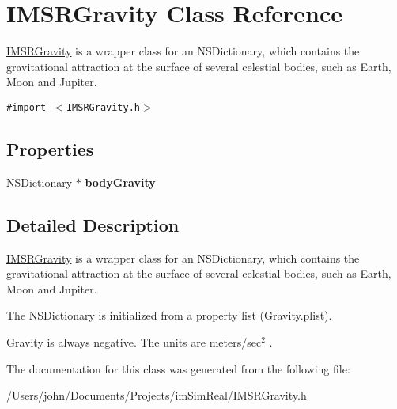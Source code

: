\hypertarget{interface_i_m_s_r_gravity}{
\section{IMSRGravity Class Reference}
\label{interface_i_m_s_r_gravity}
}
\hyperlink{interface_i_m_s_r_gravity}{IMSRGravity} is a wrapper class for an NSDictionary, which contains the gravitational attraction at the surface of several celestial bodies, such as Earth, Moon and Jupiter.  


{\tt \#import $<$IMSRGravity.h$>$}

\subsection*{Properties}
\begin{CompactItemize}
\item 
\hypertarget{interface_i_m_s_r_gravity_c80d0693a2a846db750fae929866d1a4}{
NSDictionary $\ast$ \textbf{bodyGravity}}
\label{interface_i_m_s_r_gravity_c80d0693a2a846db750fae929866d1a4}

\end{CompactItemize}


\subsection{Detailed Description}
\hyperlink{interface_i_m_s_r_gravity}{IMSRGravity} is a wrapper class for an NSDictionary, which contains the gravitational attraction at the surface of several celestial bodies, such as Earth, Moon and Jupiter. 

The NSDictionary is initialized from a property list (Gravity.plist).

Gravity is always negative. The units are meters/sec$^{\mbox{2}}$ . 

The documentation for this class was generated from the following file:\begin{CompactItemize}
\item 
/Users/john/Documents/Projects/imSimReal/IMSRGravity.h\end{CompactItemize}
